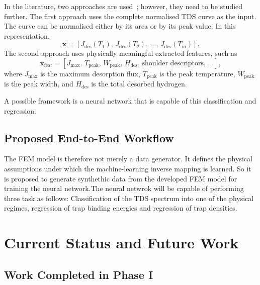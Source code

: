 \documentclass[a4paper,12pt,oneside]{report}
\begin{document}
In the literature, two approaches are used~\cite{Marrani2025,Yang2025}; however, they need to be studied further. The first approach uses the complete normalised TDS curve as the input. The curve can be normalised either by its area or by its peak value. In this representation,
\begin{equation}
  \mathbf{x} = \left[ J_{\mathrm{des}}(T_1),\, J_{\mathrm{des}}(T_2),\, \dots,\, J_{\mathrm{des}}(T_m) \right].
  \label{eq:xfull}
\end{equation}
The second approach uses physically meaningful extracted features, such as
\begin{equation}
  \mathbf{x}_{\mathrm{feat}} = \left[ J_{\max},\, T_{\mathrm{peak}},\, W_{\mathrm{peak}},\,
  H_{\mathrm{des}},\, \text{shoulder descriptors},\, \dots \right],
  \label{eq:xfeat}
\end{equation}
where $J_{\max}$ is the maximum desorption flux, $T_{\mathrm{peak}}$ is the peak temperature, $W_{\mathrm{peak}}$ is the peak width, and $H_{\mathrm{des}}$ is the total desorbed hydrogen.

A possible framework is a neural network that is capable of this classification and regression.

\section{Proposed End-to-End Workflow}
\label{sec:workflow}

The FEM model is therefore not merely a data generator. It defines the physical assumptions under which the machine-learning inverse mapping is learned.
So it is proposed to generate synthethic data from the developed FEM model for training the neural network.The neural netwrok will be capable of performing three task as follows: Classification of the TDS spectrum into one of the physical regimes, regression of trap binding energies and regression of trap densities.


\chapter{Current Status and Future Work}
\label{ch:status}

\section{Work Completed in Phase I}
\label{sec:phase1}
\end{document}
